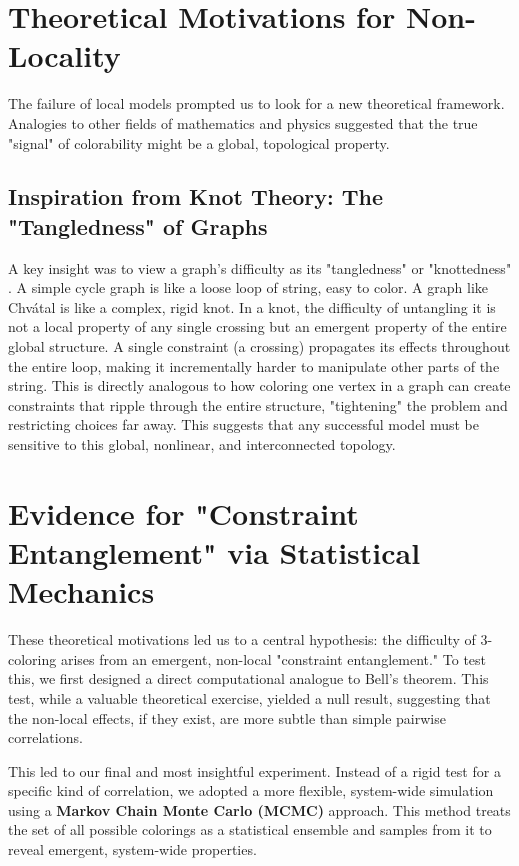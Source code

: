 \documentclass[12pt, letterpaper]{article}
\begin{document}
\section{Theoretical Motivations for Non-Locality}

The failure of local models prompted us to look for a new theoretical framework. Analogies to other fields of mathematics and physics suggested that the true "signal" of colorability might be a global, topological property.

\subsection{Inspiration from Knot Theory: The "Tangledness" of Graphs}
A key insight was to view a graph's difficulty as its "tangledness" or "knottedness" \cite{welsh1993complexity}. A simple cycle graph is like a loose loop of string, easy to color. A graph like Chvátal is like a complex, rigid knot. In a knot, the difficulty of untangling it is not a local property of any single crossing but an emergent property of the entire global structure. A single constraint (a crossing) propagates its effects throughout the entire loop, making it incrementally harder to manipulate other parts of the string. This is directly analogous to how coloring one vertex in a graph can create constraints that ripple through the entire structure, "tightening" the problem and restricting choices far away. This suggests that any successful model must be sensitive to this global, nonlinear, and interconnected topology.

\section{Evidence for "Constraint Entanglement" via Statistical Mechanics}

These theoretical motivations led us to a central hypothesis: the difficulty of 3-coloring arises from an emergent, non-local "constraint entanglement." To test this, we first designed a direct computational analogue to Bell's theorem. This test, while a valuable theoretical exercise, yielded a null result, suggesting that the non-local effects, if they exist, are more subtle than simple pairwise correlations.

This led to our final and most insightful experiment. Instead of a rigid test for a specific kind of correlation, we adopted a more flexible, system-wide simulation using a \textbf{Markov Chain Monte Carlo (MCMC)} approach. This method treats the set of all possible colorings as a statistical ensemble and samples from it to reveal emergent, system-wide properties.
\end{document}

